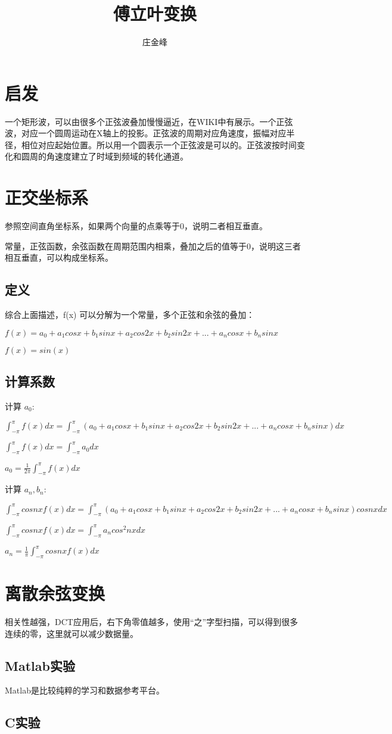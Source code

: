 \documentclass{article}
\title{傅立叶变换}
\author{庄金峰}
\begin{document}
\maketitle

\section{启发}

一个矩形波，可以由很多个正弦波叠加慢慢逼近，在WIKI中有展示。一个正弦波，对应一个圆周运动在X轴上的投影。正弦波的周期对应角速度，振幅对应半径，相位对应起始位置。所以用一个圆表示一个正弦波是可以的。正弦波按时间变化和圆周的角速度建立了时域到频域的转化通道。

\section{正交坐标系}

参照空间直角坐标系，如果两个向量的点乘等于0，说明二者相互垂直。

常量，正弦函数，余弦函数在周期范围内相乘，叠加之后的值等于0，说明这三者相互垂直，可以构成坐标系。

\subsection{定义}

综合上面描述，f(x) 可以分解为一个常量，多个正弦和余弦的叠加：

$f(x) = a_{0} + a_{1}cosx + b_{1}sinx + a_{2}cos2x + b_{2}sin2x + ... + a_{n}cosx + b_{n}sinx$

$f(x) = sin(x)$

\subsection{计算系数}

计算 $a_{0}$:

$\int_{-\pi}^{\pi} f(x)dx = \int_{-\pi}^{\pi} (a_{0} + a_{1}cosx + b_{1}sinx + a_{2}cos2x + b_{2}sin2x + ... + a_{n}cosx + b_{n}sinx) dx$

$\int_{-\pi}^{\pi} f(x)dx = \int_{-\pi}^{\pi} a_{0} dx$

$a_{0} = \frac{1}{2\pi} \int_{-\pi}^{\pi} f(x) dx$

计算 $a_{n}, b_{n}$:

$\int_{-\pi}^{\pi} cos nx f(x)dx = \int_{-\pi}^{\pi} (a_{0} + a_{1}cosx + b_{1}sinx + a_{2}cos2x + b_{2}sin2x + ... + a_{n}cosx + b_{n}sinx) cosnx dx$

$\int_{-\pi}^{\pi} cos nx f(x)dx = \int_{-\pi}^{\pi} a_{n}cos^2nxdx$

$a_{n} = \frac{1}{\pi} \int_{-\pi}^{\pi} cosnx f(x) dx$

\section{离散余弦变换}

相关性越强，DCT应用后，右下角零值越多，使用“之”字型扫描，可以得到很多连续的零，这里就可以减少数据量。

\subsection{Matlab实验}

Matlab是比较纯粹的学习和数据参考平台。

\subsection{C实验}
\end{document}
